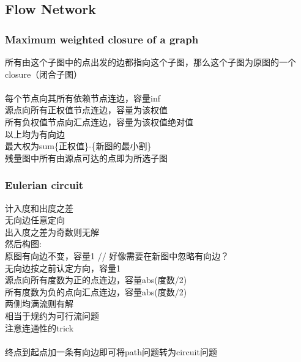 \subsection{Flow Network}
\subsubsection{Maximum weighted closure of a graph}
所有由这个子图中的点出发的边都指向这个子图，那么这个子图为原图的一个closure（闭合子图）\\
\\
每个节点向其所有依赖节点连边，容量inf\\
源点向所有正权值节点连边，容量为该权值\\
所有负权值节点向汇点连边，容量为该权值绝对值\\
以上均为有向边\\
最大权为sum\{正权值\}-\{新图的最小割\}\\
残量图中所有由源点可达的点即为所选子图
\subsubsection{Eulerian circuit}
计入度和出度之差\\
无向边任意定向\\
出入度之差为奇数则无解\\
然后构图:\\
原图有向边不变，容量1 // 好像需要在新图中忽略有向边？\\
无向边按之前认定方向，容量1\\
源点向所有度数为正的点连边，容量abs(度数/2)\\
所有度数为负的点向汇点连边，容量abs(度数/2)\\
两侧均满流则有解\\
相当于规约为可行流问题\\
注意连通性的trick\\
\\
终点到起点加一条有向边即可将path问题转为circuit问题
